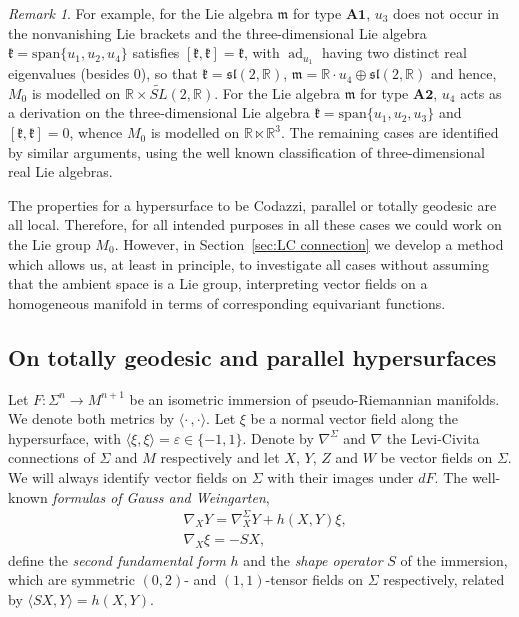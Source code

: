 \documentclass{amsart}
\theoremstyle{plain}
\theoremstyle{remark}
\newtheorem{remark}{Remark}
\def\R{\mathbb{R}}
\newcommand\m{{\mathfrak{m}}}
\newcommand\ad{\operatorname{ad}}
\begin{document}
\begin{remark}
\medskip
For example, for the Lie algebra $\m$ for type $\textbf{A1}$, $u_3$ does not occur in the nonvanishing Lie brackets and the 
three-dimensional Lie algebra $\mathfrak{k}=\mathrm{span}\{u_1,u_2,u_4\}$ satisfies $[\mathfrak{k},\mathfrak{k}]=\mathfrak{k}$, with $\ad _{u_1}$ having two distinct real eigenvalues (besides $0$), so that $\mathfrak{k}= \mathfrak{sl}(2,\R)$, $\m= \mathbb{R}\cdot u_4 \oplus \mathfrak{sl}(2,\R)$ and hence, $M_0$ is modelled on 
$\mathbb{R} \times \widetilde{SL}(2,\mathbb{R})$. For the Lie algebra $\m$ for type $\textbf{A2}$, $u_4$ acts as a derivation on the three-dimensional Lie algebra $\mathfrak{k}=\mathrm{span}\{u_1,u_2,u_3\}$ and $[\mathfrak{k},\mathfrak{k}]=0$, whence $M_0$ is modelled on $\mathbb{R} \ltimes \mathbb{R}^3$. The remaining cases are identified by similar arguments, using the well known classification of three-dimensional real Lie algebras.

	
	 The properties for a hypersurface to be Codazzi, parallel or totally geodesic are all local. Therefore, for all intended purposes  in all these cases we could work on the Lie group $M_0$. 
		However, in Section~\ref{sec:LC connection} we develop a method which allows us, at least in principle, to investigate all cases without assuming that the ambient space is a Lie group, interpreting vector fields on a homogeneous manifold in terms of corresponding equivariant functions.
	\end{remark}

 


\subsection{On totally geodesic and parallel hypersurfaces}
Let $F :\Sigma ^n \to M^{n+1}$ be an isometric immersion of pseudo-Riemannian manifolds. We denote both metrics by $\langle \cdot\,,\cdot \rangle$. Let $\xi$ be a normal vector field along the hypersurface, with $\langle \xi,\xi \rangle = \varepsilon \in \{-1,1\}$. Denote by $\nabla ^{\Sigma}$ and $\nabla$ the Levi-Civita connections of $\Sigma$ and $M$ respectively and let $X$, $Y$, $Z$ and $W$ be vector fields on $\Sigma$. We will always identify vector fields on $\Sigma$ with their images under $dF$. The well-known {\em formulas of Gauss and Weingarten},
\begin{align} 
& \nabla_X Y = \nabla ^\Sigma _X Y + h(X,Y) \xi, \label{fG} \\
& \nabla_X \xi = -SX,
\end{align}
define the \emph{second fundamental form} $h$ and the \emph{shape operator} $S$ of the immersion, which are symmetric $(0,2)$- and $(1,1)$-tensor fields on $\Sigma$ respectively, related by $\langle SX,Y \rangle = h(X,Y)$.
\end{document}

